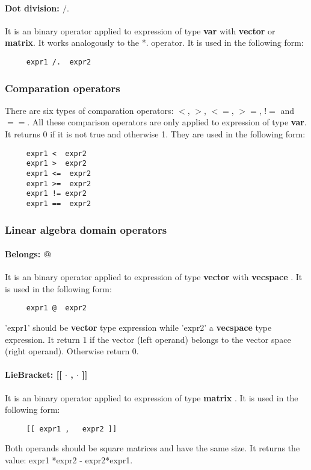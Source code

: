 \documentclass[12pt]{article} %
\begin{document}
\paragraph{Dot division: $/.$}
It is an binary operator applied to expression of type  \textbf{var} with \textbf{vector} or \textbf{matrix}. It works analogously to the *.  operator. It is used in the following form: 
\begin{lstlisting}
     expr1 /.  expr2
\end{lstlisting}

\subsubsection{Comparation operators}
 There are six types of comparation operators:  $<$, $>$, $<=$, $>=$, $!=$ and $==$. 
All these comparison operators are only applied to expression of type  \textbf{var}.  It  returns 0 if it is not true and otherwise 1. They are used in the following form:
\begin{lstlisting}
     expr1 <  expr2
     expr1 >  expr2
     expr1 <=  expr2
     expr1 >=  expr2
     expr1 != expr2
     expr1 ==  expr2
\end{lstlisting}

\subsubsection{Linear algebra domain operators}
\paragraph{Belongs: @}
It is an binary operator applied to expression of type  \textbf{vector} with \textbf{vecspace} . It is used in the following form:
\begin{lstlisting}
     expr1 @  expr2
\end{lstlisting}
'expr1' should be \textbf{vector} type expression while 'expr2'  a \textbf{vecspace} type expression. It return 1 if the  vector (left operand) belongs to the vector space (right operand). Otherwise return 0. 
 
\paragraph{LieBracket: [[ $\cdot$ ,  $\cdot$ ]] }
It is an binary operator applied to expression of type \textbf{matrix} . It is used in the following form:
\begin{lstlisting}
     [[ expr1 ,   expr2 ]]
\end{lstlisting}
Both operands should be square matrices and have the same size. It returns the value: expr1 *expr2 - expr2*expr1.
\end{document}
